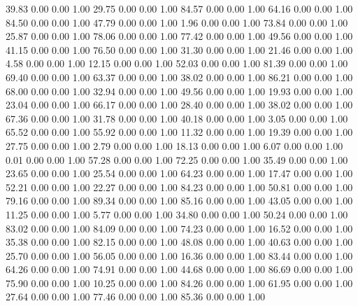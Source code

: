    39.83   0.00   0.00   1.00
   29.75   0.00   0.00   1.00
   84.57   0.00   0.00   1.00
   64.16   0.00   0.00   1.00
   84.50   0.00   0.00   1.00
   47.79   0.00   0.00   1.00
    1.96   0.00   0.00   1.00
   73.84   0.00   0.00   1.00
   25.87   0.00   0.00   1.00
   78.06   0.00   0.00   1.00
   77.42   0.00   0.00   1.00
   49.56   0.00   0.00   1.00
   41.15   0.00   0.00   1.00
   76.50   0.00   0.00   1.00
   31.30   0.00   0.00   1.00
   21.46   0.00   0.00   1.00
    4.58   0.00   0.00   1.00
   12.15   0.00   0.00   1.00
   52.03   0.00   0.00   1.00
   81.39   0.00   0.00   1.00
   69.40   0.00   0.00   1.00
   63.37   0.00   0.00   1.00
   38.02   0.00   0.00   1.00
   86.21   0.00   0.00   1.00
   68.00   0.00   0.00   1.00
   32.94   0.00   0.00   1.00
   49.56   0.00   0.00   1.00
   19.93   0.00   0.00   1.00
   23.04   0.00   0.00   1.00
   66.17   0.00   0.00   1.00
   28.40   0.00   0.00   1.00
   38.02   0.00   0.00   1.00
   67.36   0.00   0.00   1.00
   31.78   0.00   0.00   1.00
   40.18   0.00   0.00   1.00
    3.05   0.00   0.00   1.00
   65.52   0.00   0.00   1.00
   55.92   0.00   0.00   1.00
   11.32   0.00   0.00   1.00
   19.39   0.00   0.00   1.00
   27.75   0.00   0.00   1.00
    2.79   0.00   0.00   1.00
   18.13   0.00   0.00   1.00
    6.07   0.00   0.00   1.00
    0.01   0.00   0.00   1.00
   57.28   0.00   0.00   1.00
   72.25   0.00   0.00   1.00
   35.49   0.00   0.00   1.00
   23.65   0.00   0.00   1.00
   25.54   0.00   0.00   1.00
   64.23   0.00   0.00   1.00
   17.47   0.00   0.00   1.00
   52.21   0.00   0.00   1.00
   22.27   0.00   0.00   1.00
   84.23   0.00   0.00   1.00
   50.81   0.00   0.00   1.00
   79.16   0.00   0.00   1.00
   89.34   0.00   0.00   1.00
   85.16   0.00   0.00   1.00
   43.05   0.00   0.00   1.00
   11.25   0.00   0.00   1.00
    5.77   0.00   0.00   1.00
   34.80   0.00   0.00   1.00
   50.24   0.00   0.00   1.00
   83.02   0.00   0.00   1.00
   84.09   0.00   0.00   1.00
   74.23   0.00   0.00   1.00
   16.52   0.00   0.00   1.00
   35.38   0.00   0.00   1.00
   82.15   0.00   0.00   1.00
   48.08   0.00   0.00   1.00
   40.63   0.00   0.00   1.00
   25.70   0.00   0.00   1.00
   56.05   0.00   0.00   1.00
   16.36   0.00   0.00   1.00
   83.44   0.00   0.00   1.00
   64.26   0.00   0.00   1.00
   74.91   0.00   0.00   1.00
   44.68   0.00   0.00   1.00
   86.69   0.00   0.00   1.00
   75.90   0.00   0.00   1.00
   10.25   0.00   0.00   1.00
   84.26   0.00   0.00   1.00
   61.95   0.00   0.00   1.00
   27.64   0.00   0.00   1.00
   77.46   0.00   0.00   1.00
   85.36   0.00   0.00   1.00
